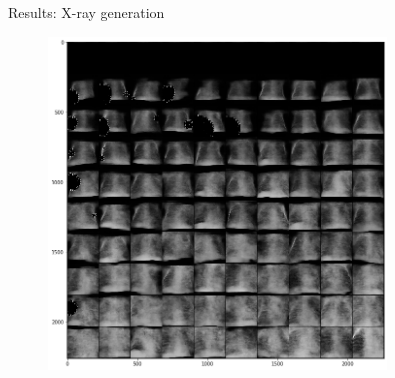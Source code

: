\begin{frame}{Results: X-ray generation}
    \begin{figure}
        \centering
        \includegraphics[width=0.8\textwidth]{Images/xray_multiple_stds.png}
    \end{figure}
\end{frame}

